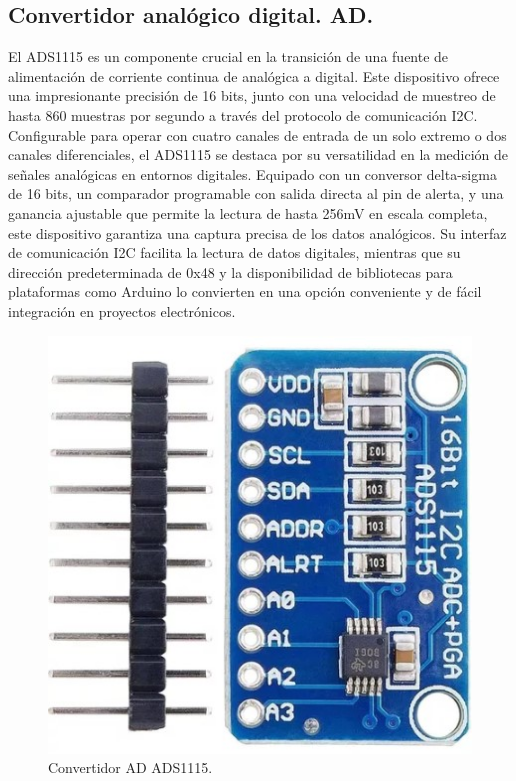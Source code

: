 \subsection{Convertidor analógico digital. AD.}
El ADS1115 es un componente crucial en la transición de una fuente de alimentación de corriente continua de analógica a digital. Este dispositivo ofrece una impresionante precisión de 16 bits, junto con una velocidad de muestreo de hasta 860 muestras por segundo a través del protocolo de comunicación I2C. Configurable para operar con cuatro canales de entrada de un solo extremo o dos canales diferenciales, el ADS1115 se destaca por su versatilidad en la medición de señales analógicas en entornos digitales. 
Equipado con un conversor delta-sigma de 16 bits, un comparador programable con salida directa al pin de alerta, y una ganancia ajustable que permite la lectura de hasta 256mV en escala completa, este dispositivo garantiza una captura precisa de los datos analógicos. Su interfaz de comunicación I2C facilita la lectura de datos digitales, mientras que su dirección predeterminada de 0x48 y la disponibilidad de bibliotecas para plataformas como Arduino lo convierten en una opción conveniente y de fácil integración en proyectos electrónicos.
\begin{figure}
    \centering
    \includegraphics[scale=0.1]{./imagenes/ads1115.jpg}
    \caption{Convertidor AD ADS1115.}
    \label{F:ADC}
\end{figure}

